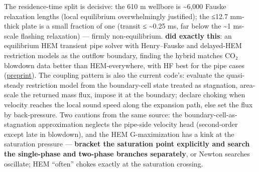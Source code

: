 The residence-time split is decisive: the 610 m wellbore is
\textasciitilde6,000 Fauske relaxation lengths (local equilibrium
overwhelmingly justified); the ≤12.7 mm-thick plate is a small fraction
of one (transit ≤ \textasciitilde0.25 ms, far below the \textasciitilde1
ms-scale flashing relaxation) --- firmly non-equilibrium. \textbf{\citet{hammer2022} did exactly this}: an equilibrium HEM transient pipe
solver with Henry--Fauske and delayed-HEM restriction models as the
outflow boundary, finding the hybrid matches CO₂ blowdown data better
than HEM-everywhere, with HF best for the pipe cases
(\href{https://www.pvv.ntnu.no/~stm/dring/outflow_preprint.pdf}{preprint}).
The coupling pattern is also the current code's: evaluate the
quasi-steady restriction model from the boundary-cell state treated as
stagnation, area-scale the returned mass flux, impose it at the
boundary; declare choking when velocity reaches the local sound speed
along the expansion path, else set the flux by back-pressure. Two
cautions from the same source: the boundary-cell-as-stagnation
approximation neglects the pipe-side velocity head (second-order except
late in blowdown), and the HEM G-maximization has a kink at the
saturation pressure --- \textbf{bracket the saturation point explicitly
and search the single-phase and two-phase branches separately}, or
Newton searches oscillate; HEM ``often'' chokes exactly at the
saturation crossing.

